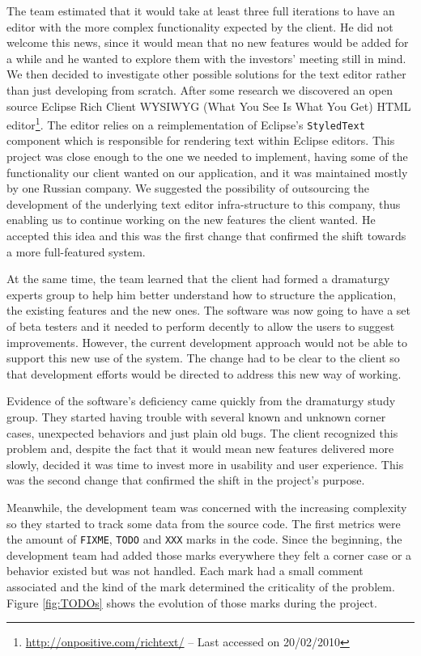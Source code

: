 \documentclass[lnbip]{svmultln}
\begin{document}
The team estimated that it would take at least three full iterations
to have an editor with the more complex functionality expected by the
client. He did not welcome this news, since it would mean that no new
features would be added for a while and he wanted to explore them with
the investors' meeting still in mind.  We then decided to investigate
other possible solutions for the text editor rather than just
developing from scratch. After some research we discovered an open
source Eclipse Rich Client WYSIWYG (What You See Is What You Get) HTML
editor\footnote{\url{http://onpositive.com/richtext/} -- Last accessed
  on 20/02/2010}. The editor relies on a reimplementation of Eclipse's
\texttt{StyledText} component which is responsible for rendering text
within Eclipse editors. This project was close enough to the one we
needed to implement, having some of the functionality our client
wanted on our application, and it was maintained mostly by one Russian
company. We suggested the possibility of outsourcing the development
of the underlying text editor infra-structure to this company, thus
enabling us to continue working on the new features the client
wanted. He accepted this idea and this was the first change that
confirmed the shift towards a more full-featured system.

At the same time, the team learned that the client had formed a
dramaturgy experts group to help him better understand how to
structure the application, the existing features and the new ones. The
software was now going to have a set of beta testers and it needed to
perform decently to allow the users to suggest improvements. However,
the current development approach would not be able to support this new
use of the system. The change had to be clear to the client so that
development efforts would be directed to address this new way of
working.

Evidence of the software's deficiency came quickly from the dramaturgy
study group. They started having trouble with several known and
unknown corner cases, unexpected behaviors and just plain old
bugs. The client recognized this problem and, despite the fact that it
would mean new features delivered more slowly, decided it was time to
invest more in usability and user experience. This was the second
change that confirmed the shift in the project's purpose.

Meanwhile, the development team was concerned with the increasing
complexity so they started to track some data from the source
code. The first metrics were the amount of \texttt{FIXME},
\texttt{TODO} and \texttt{XXX} marks in the code. Since the beginning,
the development team had added those marks everywhere they felt a
corner case or a behavior existed but was not handled. Each mark had a
small comment associated and the kind of the mark determined the
criticality of the problem. Figure \ref{fig:TODOs} shows the evolution
of those marks during the project.
\end{document}
